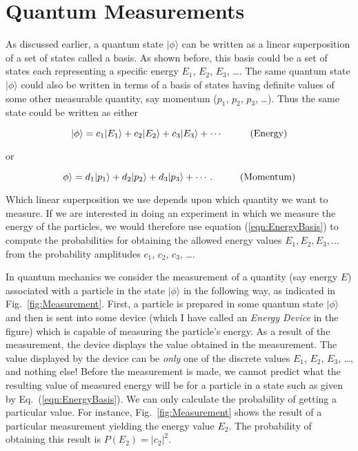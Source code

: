 \section{Quantum Measurements}

As discussed earlier, a quantum state $|\mbox{$\phi$}\rangle$ can be
written as a linear superposition of a set of states called a basis.
As shown before, this basis could be a set of states each representing
a specific energy $E_1$, $E_2$, $E_3$, \ldots . The same quantum state
$|\mbox{$\phi$}\rangle$ could also be written in terms of a basis of
states having definite values of some other measurable quantity,
say momentum ($p_1$, $p_2$, $p_3$, \ldots).  Thus the same state could be
written as either

\begin{equation}
\label{eqn:EnergyBasis}
|\phi\rangle = c_1 |E_1\rangle + c_2 |E_2\rangle 
     + c_3 |E_3\rangle + \cdots  \hspace{1.0cm} \mbox{(Energy)}
\end{equation}

\noindent or

\begin{equation}
\phi\rangle = d_1 |p_1\rangle + d_2 |p_2\rangle 
  + d_3 |p_3\rangle + \cdots . \hspace{1.0cm} \mbox{(Momentum)}
\end{equation}

\noindent Which linear superposition we use depends upon which quantity
we want to measure.  If we are interested in doing an experiment in which
we measure the energy of the particles, we would therefore use equation
(\ref{eqn:EnergyBasis}) to compute the probabilities for obtaining
the allowed energy values $E_1, E_2, E_3, \ldots$ from the probability
amplitudes $c_1$, $c_2$, $c_3$, \ldots.

In quantum mechanics we consider the measurement of a quantity (say energy
$E$) associated with a particle in the state $|\mbox{$\phi$}\rangle$ in
the following way, as indicated in Fig.~\ref{fig:Measurement}.  First,
a particle is prepared in some quantum state $|\mbox{$\phi$}\rangle$ and
then is sent into some device (which I have called an {\em Energy Device}
in the figure) which is capable of measuring the particle's energy.
As a result of the measurement, the device displays the value obtained in
the measurement.  The value displayed by the device can be {\em only} one
of the discrete values $E_1$, $E_2$, $E_3$, \dots, and nothing else! Before
the measurement is made, we cannot predict what the resulting value
of measured energy will be for a particle in a state such as given by
Eq.~(\ref{eqn:EnergyBasis}). We can only calculate the probability of
getting a particular value.  For instance, Fig.~\ref{fig:Measurement}
shows the result of a particular measurement yielding the energy value
$E_2$.  The probability of obtaining this result is $P(E_2) = |c_2|^2$.

